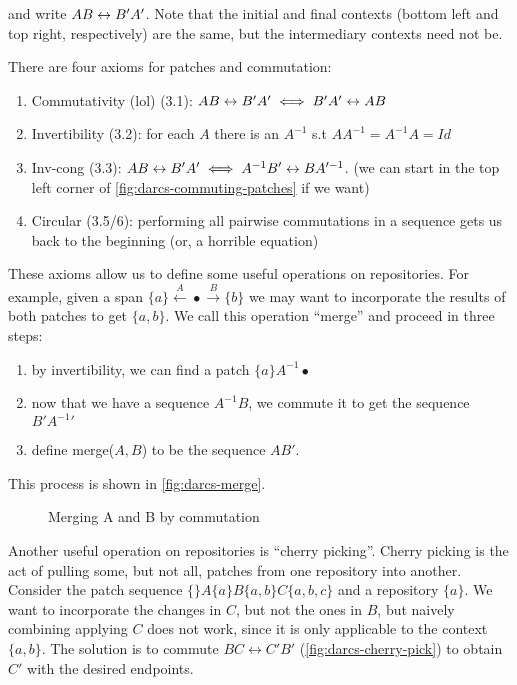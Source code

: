 and write $AB \leftrightarrow B'A'$. Note that the initial and final contexts (bottom left and top right,
respectively) are the same, but the intermediary contexts need not be.

There are four axioms for patches and commutation:
\begin{enumerate}
  \item Commutativity (lol) (3.1): $AB \leftrightarrow B'A' \iff B'A' \leftrightarrow AB$
  \item Invertibility (3.2): for each $A$ there is an $A^{-1}$ s.t
    $AA^{-1}=A^{-1}A=Id$
  \item Inv-cong (3.3): $AB \leftrightarrow B'A' \iff A^{-1}B' \leftrightarrow BA'^{-1}$. (we can
    start in the top left corner of \autoref{fig:darcs-commuting-patches} if we want)
    \label{axiom:darcs-inv-cong}
  \item Circular (3.5/6): performing all pairwise commutations in a sequence
    gets us back to the beginning (or, a horrible equation)
\end{enumerate}

These axioms allow us to define some useful operations on repositories. For
example, given a span $\{a\} \xleftarrow{A} \bullet \xrightarrow{B} \{b\}$ we
may want to incorporate the results of both patches to get $\{a,b\}$. We call
this operation ``merge'' and proceed in three steps:
\begin{enumerate}
\item by invertibility, we can find a patch $\{a\}A^{-1} \bullet$
\item now that we have a sequence $A^{-1}B$, we commute it to get the sequence $B'{A^{-1}}'$
\item define merge($A, B$) to be the sequence $AB'$.
\end{enumerate}
This process is shown in \autoref{fig:darcs-merge}.

\begin{figure}
\begin{center}
\end{center}
\caption{Merging A and B by commutation}
\label{fig:darcs-merge}
\end{figure}

Another useful operation on repositories is ``cherry picking''. Cherry picking
is the act of pulling some, but not all, patches from one repository into another.
Consider the patch sequence $\{\}A\{a\}B\{a,b\}C\{a,b,c\}$ and a repository
$\{a\}$. We want to incorporate the changes in $C$, but not the ones in $B$, but
naively combining applying $C$ does not work, since it is only applicable to the
context $\{a,b\}$. The solution is to commute $BC \leftrightarrow C'B'$ (\autoref{fig:darcs-cherry-pick}) to
obtain $C'$ with the desired endpoints.

